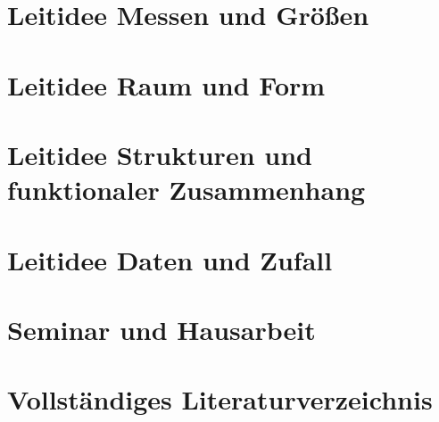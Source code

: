 \documentclass[
]{scrbook}
\theoremstyle{definition}
\theoremstyle{definition}
\theoremstyle{definition}
\theoremstyle{definition}
\theoremstyle{remark}
\begin{document}
\hypertarget{leitidee-messen-und-gruxf6uxdfen}{%
\chapter{Leitidee Messen und Größen}\label{leitidee-messen-und-gruxf6uxdfen}}

\hypertarget{leitidee-raum-und-form}{%
\chapter{Leitidee Raum und Form}\label{leitidee-raum-und-form}}

\hypertarget{leitidee-strukturen-und-funktionaler-zusammenhang}{%
\chapter{Leitidee Strukturen und funktionaler Zusammenhang}\label{leitidee-strukturen-und-funktionaler-zusammenhang}}

\hypertarget{leitidee-daten-und-zufall}{%
\chapter{Leitidee Daten und Zufall}\label{leitidee-daten-und-zufall}}

\hypertarget{appendix-anhang}{%
\appendix}


\hypertarget{seminar-und-hausarbeit}{%
\chapter{Seminar und Hausarbeit}\label{seminar-und-hausarbeit}}

\hypertarget{vollstuxe4ndiges-literaturverzeichnis}{%
\chapter{Vollständiges Literaturverzeichnis}\label{vollstuxe4ndiges-literaturverzeichnis}}
\end{document}
